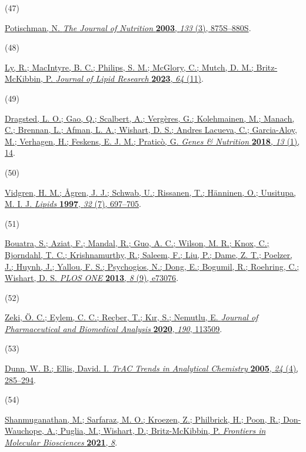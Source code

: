 \documentclass[journal=jacsat,manuscript=article]{achemso}
\newlength{\cslhangindent}
\newlength{\csllabelwidth}
\newenvironment{CSLReferences}[2] %
 {\begin{list}{}{%
  \setlength{\itemindent}{0pt}
  \setlength{\leftmargin}{0pt}
  \setlength{\parsep}{0pt}
  \ifodd #1
   \setlength{\leftmargin}{\cslhangindent}
   \setlength{\itemindent}{-1\cslhangindent}
  \fi
  \setlength{\itemsep}{#2\baselineskip}}}
 {\end{list}}
\newcommand{\CSLLeftMargin}[1]{\parbox[t]{\csllabelwidth}{#1}}
\newcommand{\CSLRightInline}[1]{\parbox[t]{\linewidth - \csllabelwidth}{#1}\break}
\begin{document}
\begin{CSLReferences}{0}{0}
\CSLLeftMargin{(47) }%
\CSLRightInline{\href{https://doi.org/10.1093/jn/133.3.875S}{Potischman,
N. \emph{The Journal of Nutrition} \textbf{2003}, \emph{133} (3),
875S--880S}.}

\CSLLeftMargin{(48) }%
\CSLRightInline{\href{https://doi.org/10.1016/j.jlr.2023.100445}{Ly, R.;
MacIntyre, B. C.; Philips, S. M.; McGlory, C.; Mutch, D. M.;
Britz-McKibbin, P. \emph{Journal of Lipid Research} \textbf{2023},
\emph{64} (11)}.}

\CSLLeftMargin{(49) }%
\CSLRightInline{\href{https://doi.org/10.1186/s12263-018-0603-9}{Dragsted,
L. O.; Gao, Q.; Scalbert, A.; Vergères, G.; Kolehmainen, M.; Manach, C.;
Brennan, L.; Afman, L. A.; Wishart, D. S.; Andres Lacueva, C.;
Garcia-Aloy, M.; Verhagen, H.; Feskens, E. J. M.; Praticò, G.
\emph{Genes \& Nutrition} \textbf{2018}, \emph{13} (1), 14}.}

\CSLLeftMargin{(50) }%
\CSLRightInline{\href{https://doi.org/10.1007/s11745-997-0089-x}{Vidgren,
H. M.; Ågren, J. J.; Schwab, U.; Rissanen, T.; Hänninen, O.; Uusitupa,
M. I. J. \emph{Lipids} \textbf{1997}, \emph{32} (7), 697--705}.}

\CSLLeftMargin{(51) }%
\CSLRightInline{\href{https://doi.org/10.1371/journal.pone.0073076}{Bouatra,
S.; Aziat, F.; Mandal, R.; Guo, A. C.; Wilson, M. R.; Knox, C.;
Bjorndahl, T. C.; Krishnamurthy, R.; Saleem, F.; Liu, P.; Dame, Z. T.;
Poelzer, J.; Huynh, J.; Yallou, F. S.; Psychogios, N.; Dong, E.;
Bogumil, R.; Roehring, C.; Wishart, D. S. \emph{PLOS ONE} \textbf{2013},
\emph{8} (9), e73076}.}

\CSLLeftMargin{(52) }%
\CSLRightInline{\href{https://doi.org/10.1016/j.jpba.2020.113509}{Zeki,
Ö. C.; Eylem, C. C.; Reçber, T.; Kır, S.; Nemutlu, E. \emph{Journal of
Pharmaceutical and Biomedical Analysis} \textbf{2020}, \emph{190},
113509}.}

\CSLLeftMargin{(53) }%
\CSLRightInline{\href{https://doi.org/10.1016/j.trac.2004.11.021}{Dunn,
W. B.; Ellis, David. I. \emph{TrAC Trends in Analytical Chemistry}
\textbf{2005}, \emph{24} (4), 285--294}.}

\CSLLeftMargin{(54) }%
\CSLRightInline{\href{https://doi.org/10.3389/fmolb.2021.676349}{Shanmuganathan,
M.; Sarfaraz, M. O.; Kroezen, Z.; Philbrick, H.; Poon, R.; Don-Wauchope,
A.; Puglia, M.; Wishart, D.; Britz-McKibbin, P. \emph{Frontiers in
Molecular Biosciences} \textbf{2021}, \emph{8}}.}

\end{CSLReferences}
\end{document}
